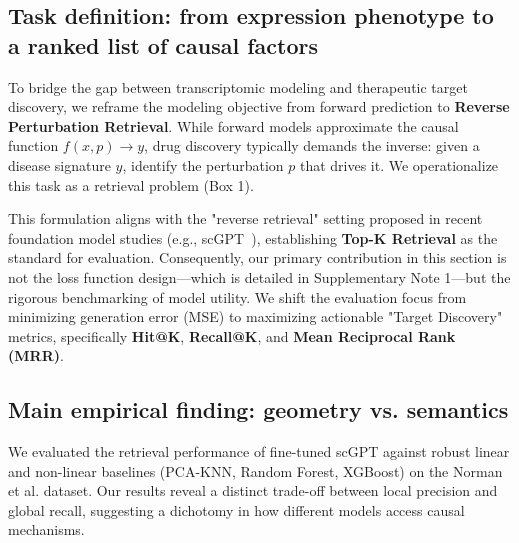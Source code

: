 \documentclass{article}
\begin{document}
\subsection{Task definition: from expression phenotype to a ranked list of causal factors}

To bridge the gap between transcriptomic modeling and therapeutic target discovery, we reframe the modeling objective from forward prediction to \textbf{Reverse Perturbation Retrieval}. While forward models approximate the causal function $f(x, p) \rightarrow y$, drug discovery typically demands the inverse: given a disease signature $y$, identify the perturbation $p$ that drives it. We operationalize this task as a retrieval problem (Box 1).

\begin{center}
\end{center}

This formulation aligns with the "reverse retrieval" setting proposed in recent foundation model studies (e.g., scGPT~\cite{cui_scgpt_2024}), establishing \textbf{Top-K Retrieval} as the standard for evaluation. Consequently, our primary contribution in this section is not the loss function design—which is detailed in Supplementary Note 1—but the rigorous benchmarking of model utility. We shift the evaluation focus from minimizing generation error (MSE) to maximizing actionable "Target Discovery" metrics, specifically \textbf{Hit@K}, \textbf{Recall@K}, and \textbf{Mean Reciprocal Rank (MRR)}.

\subsection{Main empirical finding: geometry vs. semantics}

We evaluated the retrieval performance of fine-tuned scGPT against robust linear and non-linear baselines (PCA-KNN, Random Forest, XGBoost) on the Norman et al. dataset. Our results reveal a distinct trade-off between local precision and global recall, suggesting a dichotomy in how different models access causal mechanisms.
\end{document}
